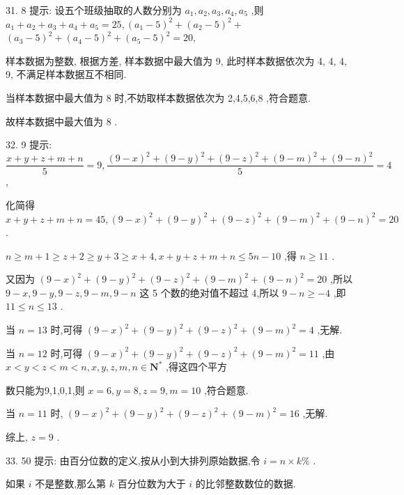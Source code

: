 31. 8 提示: 设五个班级抽取的人数分别为 ${a}_{1},{a}_{2},{a}_{3},{a}_{4},{a}_{5}$ ,则 ${a}_{1} + {a}_{2} + {a}_{3} + {a}_{4} + {a}_{5} = {25},{\left( {a}_{1} - 5\right) }^{2} + {\left( {a}_{2} - 5\right) }^{2} +$  ${\left( {a}_{3} - 5\right) }^{2} + {\left( {a}_{4} - 5\right) }^{2} + {\left( {a}_{5} - 5\right) }^{2} = {20},$

样本数据为整数, 根据方差, 样本数据中最大值为 9, 此时样本数据依次为 4, 4, 4, 9, 不满足样本数据互不相同.

当样本数据中最大值为 8 时,不妨取样本数据依次为 2,4,5,6,8 ,符合题意.

故样本数据中最大值为 8 .

32. 9 提示: $\dfrac{x + y + z + m + n}{5} = 9,\dfrac{{\left( 9 - x\right) }^{2} + {\left( 9 - y\right) }^{2} + {\left( 9 - z\right) }^{2} + {\left( 9 - m\right) }^{2} + {\left( 9 - n\right) }^{2}}{5} = 4$ ,

化简得 $x + y + z + m + n = {45},{\left( 9 - x\right) }^{2} + {\left( 9 - y\right) }^{2} + {\left( 9 - z\right) }^{2} + {\left( 9 - m\right) }^{2} + {\left( 9 - n\right) }^{2} = {20}$ .

$n \geq  m + 1 \geq  z + 2 \geq  y + 3 \geq  x + 4,x + y + z + m + n \leq  {5n} - {10}$ ,得 $n \geq  {11}$ .

又因为 ${\left( 9 - x\right) }^{2} + {\left( 9 - y\right) }^{2} + {\left( 9 - z\right) }^{2} + {\left( 9 - m\right) }^{2} + {\left( 9 - n\right) }^{2} = {20}$ ,所以 $9 - x,9 - y,9 - z,9 - m,9 - n$ 这 5 个数的绝对值不超过 4,所以 $9 - n \geq   - 4$ ,即 ${11} \leq  n \leq  {13}$ .

当 $n = {13}$ 时,可得 ${\left( 9 - x\right) }^{2} + {\left( 9 - y\right) }^{2} + {\left( 9 - z\right) }^{2} + {\left( 9 - m\right) }^{2} = 4$ ,无解.

当 $n = {12}$ 时,可得 ${\left( 9 - x\right) }^{2} + {\left( 9 - y\right) }^{2} + {\left( 9 - z\right) }^{2} + {\left( 9 - m\right) }^{2} = {11}$ ,由 $x < y < z < m < n,x,y,z,m,n \in  {\mathbf{N}}^{ * }$ ,得这四个平方

数只能为9,1,0,1,则 $x = 6,y = 8,z = 9,m = {10}$ ,符合题意.

当 $n = {11}$ 时, ${\left( 9 - x\right) }^{2} + {\left( 9 - y\right) }^{2} + {\left( 9 - z\right) }^{2} + {\left( 9 - m\right) }^{2} = {16}$ ,无解.

综上, $z = 9$ .

33. 50 提示: 由百分位数的定义,按从小到大排列原始数据,令 $i = n \times  k\%$ .

如果 $i$ 不是整数,那么第 $k$ 百分位数为大于 $i$ 的比邻整数数位的数据.

